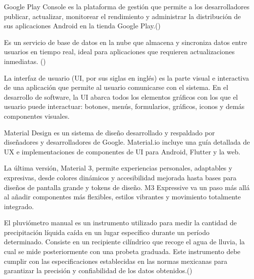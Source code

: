 \begin{definition}
  Google Play Console es la plataforma de gestión que permite a los desarrolladores publicar, actualizar, monitorear el rendimiento y administrar la distribución de sus aplicaciones Android en la tienda Google Play.(\cite{googleplayconsole})


\end{definition}

\begin{definition}
Es un servicio de base de datos en la nube que almacena y sincroniza datos entre usuarios en tiempo real, ideal para aplicaciones que requieren actualizaciones inmediatas. (\cite{firebaserealtime})
\end{definition}

\begin{definition}
  La interfaz de usuario (UI, por sus siglas en inglés) es la parte visual e interactiva de una aplicación que permite al usuario comunicarse con el sistema. En el desarrollo de software, la UI abarca todos los elementos gráficos con los que el usuario puede interactuar: botones, menús, formularios, gráficos, iconos y demás componentes visuales.   
\end{definition}


\begin{definition}
Material Design es un sistema de diseño desarrollado y respaldado por diseñadores y desarrolladores de Google. Material.io incluye una guía detallada de UX e implementaciones de componentes de UI para Android, Flutter y la web.

La última versión, Material 3, permite experiencias personales, adaptables y expresivas, desde colores dinámicos y accesibilidad mejorada hasta bases para diseños de pantalla grande y tokens de diseño. M3 Expressive va un paso más allá al añadir componentes más flexibles, estilos vibrantes y movimiento totalmente integrado.
\end{definition}

\begin{definition}

El pluviómetro manual es un instrumento utilizado para medir la cantidad de precipitación líquida caída en un lugar específico durante un período determinado. Consiste en un recipiente cilíndrico que recoge el agua de lluvia, la cual se mide posteriormente con una probeta graduada. Este instrumento debe cumplir con las especificaciones establecidas en las normas mexicanas para garantizar la precisión y confiabilidad de los datos obtenidos.(\cite{semarnat_pluviometro})
\end{definition}

